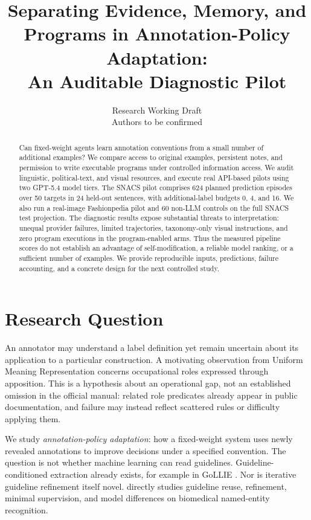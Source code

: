 \documentclass[11pt]{article}
\title{Separating Evidence, Memory, and Programs in Annotation-Policy Adaptation:\\An Auditable Diagnostic Pilot}
\author{Research Working Draft\\Authors to be confirmed}
\begin{document}
\maketitle
\begin{abstract}
Can fixed-weight agents learn annotation conventions from a small number of additional examples? We compare access to original examples, persistent notes, and permission to write executable programs under controlled information access. We audit linguistic, political-text, and visual resources, and execute real API-based pilots using two GPT-5.4 model tiers. The SNACS pilot comprises 624 planned prediction episodes over 50 targets in 24 held-out sentences, with additional-label budgets 0, 4, and 16. We also run a real-image Fashionpedia pilot and 60 non-LLM controls on the full SNACS test projection. The diagnostic results expose substantial threats to interpretation: unequal provider failures, limited trajectories, taxonomy-only visual instructions, and zero program executions in the program-enabled arms. Thus the measured pipeline scores do not establish an advantage of self-modification, a reliable model ranking, or a sufficient number of examples. We provide reproducible inputs, predictions, failure accounting, and a concrete design for the next controlled study.
\end{abstract}

\noindent{}

\section{Research Question}
An annotator may understand a label definition yet remain uncertain about its application to a particular construction. A motivating observation from Uniform Meaning Representation concerns occupational roles expressed through apposition. This is a hypothesis about an operational gap, not an established omission in the official manual: related role predicates already appear in public documentation, and failure may instead reflect scattered rules or difficulty applying them.

We study \emph{annotation-policy adaptation}: how a fixed-weight system uses newly revealed annotations to improve decisions under a specified convention. The question is not whether machine learning can read guidelines. Guideline-conditioned extraction already exists, for example in GoLLIE \citep{gollie}. Nor is iterative guideline refinement itself novel. \citet{kim2026refining} directly studies guideline reuse, refinement, minimal supervision, and model differences on biomedical named-entity recognition.
\end{document}
